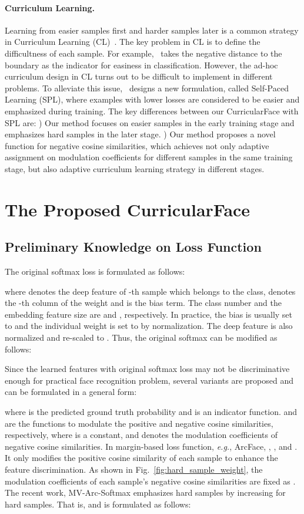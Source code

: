 \documentclass[10pt,twocolumn,letterpaper]{article}
\begin{document}
\paragraph{Curriculum Learning.}
Learning from easier samples first and harder samples later is a common strategy in Curriculum Learning (CL)~\cite{bengio2009curriculum,zhou2018scheduled}.
The key problem in CL is to define the difficultness of each sample.
For example,~\cite{basu2013teaching} takes the negative distance to the boundary as the indicator for easiness in classification.
However, the ad-hoc curriculum design in CL turns out to be difficult to implement in different problems.
To alleviate this issue,~\cite{kumar2010selfpace} designs a new formulation, called Self-Paced Learning (SPL), where examples with lower losses are considered to be easier and emphasized during training.
The key differences between our CurricularFace with SPL are:
) Our method focuses on easier samples in the early training stage and emphasizes hard samples in the later stage.
) Our method proposes a novel function  for negative cosine similarities, which achieves not only adaptive assignment on modulation coefficients  for different samples in the same training stage,
but also adaptive curriculum learning strategy in different stages.


\section{The Proposed CurricularFace}
\subsection{Preliminary Knowledge on Loss Function}
The original softmax loss is formulated as follows:

where  denotes the deep feature of -th sample which belongs to the  class,  denotes the -th column of the weight  and  is the bias term.
The class number and the embedding feature size are  and , respectively.
In practice, the bias is usually set to  and the individual weight is set to  by  normalization. The deep feature is also normalized and re-scaled to . Thus, the original softmax can be modified as follows:

Since the learned features with original softmax loss may not be discriminative enough for practical face recognition problem, several variants are proposed and can be formulated in a general form:

where  is the predicted ground truth probability and  is an indicator function.
 and  are the functions to modulate the positive and negative cosine similarities, respectively, where  is a constant, and  denotes the modulation coefficients of negative cosine similarities.
In margin-based loss function, \textit{e.g.}, ArcFace, , , and .
It only modifies the positive cosine similarity of each sample to enhance the feature discrimination. As shown in Fig.~\ref{fig:hard_sample_weight}, the modulation coefficients  of each sample's negative cosine similarities are fixed as .
The recent work, MV-Arc-Softmax emphasizes hard samples by increasing  for hard samples.
That is,  and  is formulated as follows:
\end{document}
